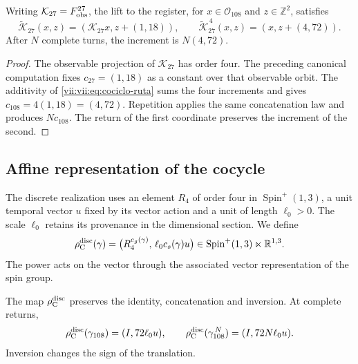 \begin{proposition}
\label{vii:vii:prop:memoria-vuelta-completa}
Writing \(\mathcal K_{27}=F_{\rm obs}^{27}\), the lift
to the register, for \(x\in\mathcal O_{108}\) and \(z\in\mathbb Z^2\), satisfies
\[
 \widetilde{\mathcal K}_{27}(x,z)
   =(\mathcal K_{27}x,z+(1,18)),\qquad
 \widetilde{\mathcal K}_{27}^{\,4}(x,z)
   =(x,z+(4,72)).
\]
After \(N\) complete turns, the increment is \(N(4,72)\).
\end{proposition}

\begin{proof}
The observable projection of \(\mathcal K_{27}\) has order four.
The preceding canonical computation fixes \(c_{27}=(1,18)\) as a constant
over that observable orbit. The additivity of
\eqref{vii:vii:eq:cociclo-ruta} sums the four increments and gives
\(c_{108}=4(1,18)=(4,72)\).
Repetition applies the same concatenation law and produces
\(Nc_{108}\). The return of the first coordinate preserves the
increment of the second.
\end{proof}

\subsection{Affine representation of the cocycle}
\label{vii:vii:subsec:representacion-afin-cociclo}

The discrete realization uses an element \(R_4\) of order four in
\(\operatorname{Spin}^+(1,3)\), a unit temporal vector \(u\)
fixed by its vector action and a unit of length \(\ell_0>0\).
The scale \(\ell_0\) retains its provenance in the dimensional section.
We define
\begin{equation}
 \rho_{\rm C}^{\rm disc}(\gamma)=
 \bigl(R_4^{c_g(\gamma)},\,\ell_0c_s(\gamma)u\bigr)
 \in\operatorname{Spin}^+(1,3)\ltimes\mathbb R^{1,3}.
 \label{vii:vii:eq:representacion-discreta-memoria}
\end{equation}
The power acts on the vector through the associated vector
representation of the spin group.

\begin{theorem}
\label{vii:vii:thm:traslacion-memoria}
The map \(\rho_{\rm C}^{\rm disc}\) preserves the identity,
concatenation and inversion. At complete returns,
\begin{equation}
 \rho_{\rm C}^{\rm disc}(\gamma_{108})=(I,72\ell_0u),\qquad
 \rho_{\rm C}^{\rm disc}(\gamma_{108}^{\,N})=(I,72N\ell_0u).
 \label{vii:vii:eq:traslacion-retorno-108}
\end{equation}
Inversion changes the sign of the translation.
\end{theorem}

